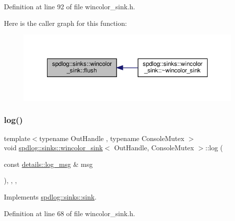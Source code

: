 Definition at line 92 of file wincolor\+\_\+sink.\+h.

Here is the caller graph for this function\+:
\nopagebreak
\begin{figure}[H]
\begin{center}
\leavevmode
\includegraphics[width=348pt]{classspdlog_1_1sinks_1_1wincolor__sink_a3746a35fc36218e76dc3080e52fe6233_icgraph}
\end{center}
\end{figure}
\mbox{\label{classspdlog_1_1sinks_1_1wincolor__sink_a64d98363a05d1a7a4f295f6de1b5cec1}} 
\subsubsection{\texorpdfstring{log()}{log()}}
{\footnotesize\ttfamily template$<$typename Out\+Handle , typename Console\+Mutex $>$ \\
void \hyperlink{classspdlog_1_1sinks_1_1wincolor__sink}{spdlog\+::sinks\+::wincolor\+\_\+sink}$<$ Out\+Handle, Console\+Mutex $>$\+::log (\begin{DoxyParamCaption}\item[{const \hyperlink{structspdlog_1_1details_1_1log__msg}{details\+::log\+\_\+msg} \&}]{msg }\end{DoxyParamCaption})\hspace{0.3cm}{\ttfamily [inline]}, {\ttfamily [final]}, {\ttfamily [override]}, {\ttfamily [virtual]}}



Implements \hyperlink{classspdlog_1_1sinks_1_1sink_a51d8f34ad79064e0dc13c6013236e427}{spdlog\+::sinks\+::sink}.



Definition at line 68 of file wincolor\+\_\+sink.\+h.

\mbox{\label{classspdlog_1_1sinks_1_1wincolor__sink_a54ca784b8f5e1ee9c2adcda3125c3515}} 

